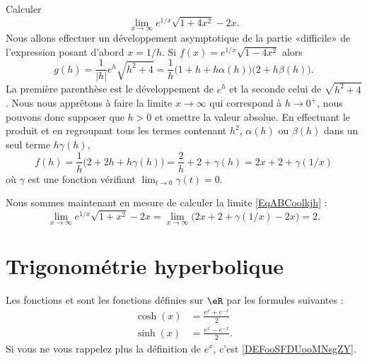 \begin{example}	\label{ExBCDookjljhjk}
    Calculer
    \begin{equation}\label{EqABCoolkjh}
        \lim_{x\to \infty}  e^{1/x}\sqrt{1+4x^2}-2x.
    \end{equation}
    Nous allons effectuer un développement asymptotique de la partie «difficile» de l'expression posant d'abord $x=1/h$. Si $f(x)=e^{1/x}\sqrt{1-4x^2}$ alors
    \begin{equation}
	g(h)=\frac{1}{|h|}e^h\sqrt{h^2+4}=\frac{1}{h}\big(  1+h+h\alpha(h) \big)\big( 2+h\beta(h) \big).
    \end{equation}
    La première parenthèse est le développement de $e^h$ et la seconde celui de $\sqrt{h^2+4}$. Nous nous apprêtons à faire la limite $x\to\infty$ qui correspond à $h\to 0^+$, nous pouvons donc supposer que $h>0$ et omettre la valeur absolue. En effectuant le produit et en regroupant tous les termes contenant $h^2$, $\alpha(h)$ ou $\beta(h)$ dans un seul terme $h\gamma(h)$,
    \begin{equation}
	f(h)=\frac{1}{h}\big(  2+2h+h\gamma(h) \big)=\frac{2}{h}+2+\gamma(h)=2x+2+\gamma(1/x)
    \end{equation}
    où $\gamma$ est une fonction vérifiant $\lim_{t\to 0}\gamma(t)=0$.

    Nous sommes maintenant en mesure de calculer la limite \eqref{EqABCoolkjh} :
    \begin{equation}
	\lim_{x\to\infty}e^{1/x}\sqrt{1+x^2}-2x= \lim_{x\to \infty}\big(  2x+2+\gamma(1/x)-2x \big)=2.
    \end{equation}
\end{example}

\section{Trigonométrie hyperbolique}

\begin{definition}
    Les fonctions  et  sont les fonctions définies sur $\eR$ par les formules suivantes :
    \begin{subequations}
        \begin{align}
            \cosh(x)&=\frac{  e^{x}+ e^{-x} }{2}\\
            \sinh(x)&=\frac{  e^{x}- e^{-x} }{2}.
        \end{align}
    \end{subequations}
    Si vous ne vous rappelez plus la définition de \( e^x\), c'est \ref{DEFooSFDUooMNsgZY}.
\end{definition}

